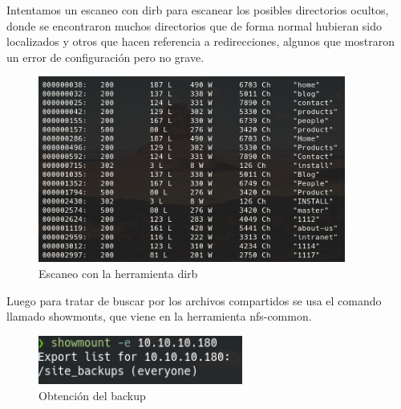 \documentclass{article}
\begin{document}
Intentamos un escaneo con dirb para escanear los posibles directorios ocultos, donde se encontraron muchos directorios que de forma normal hubieran sido localizados y otros que hacen referencia a redirecciones, algunos que mostraron un error de configuración pero no grave.
\begin{figure}[h!]
	\center 
	\includegraphics[width=0.9\textwidth]{images/remote/dirb.png}
	\caption{Escaneo con la herramienta dirb}
\end{figure}

\clearpage

Luego para tratar de buscar por los archivos compartidos se usa el comando llamado showmonts, que viene en la herramienta nfs-common.
\begin{figure}[h]
	\center 
	\includegraphics[width=0.6\textwidth]{images/remote/nfs.png}
	\caption{Obtención del backup}
\end{figure}
\end{document}
